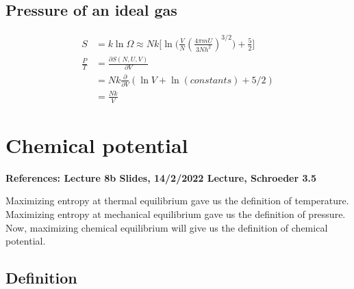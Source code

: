 \documentclass[11pt]{article}
\begin{document}
\subsection{Pressure of an ideal gas} 
\begin{align*}
S &= k \ln \Omega \approx Nk \Bigg[\ln \big(\frac{V}{N}(\frac{4\pi m U}{3Nh^2})^{3/2}\big) + \frac{5}{2}\Bigg] \\
\frac{P}{T} &= \frac{\partial S(N,U,V)}{\partial V} \\
&= Nk \frac{\partial}{\partial V} (\ln V+ \ln(constants) + 5/2)  \\
&= \frac{Nk}{V}
\end{align*}

\section{Chemical potential}
\textbf{References: Lecture 8b Slides, 14/2/2022 Lecture, Schroeder 3.5}

Maximizing entropy at thermal equilibrium gave us the definition of temperature. Maximizing entropy at mechanical equilibrium gave us the definition of pressure. Now, maximizing chemical equilibrium will give us the definition of chemical potential.

\subsection{Definition}
\end{document}
